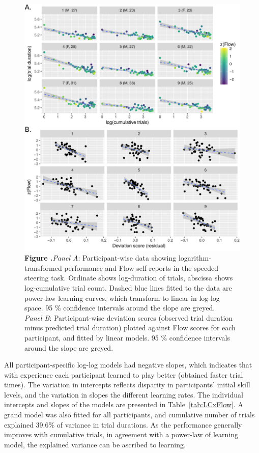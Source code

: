 \documentclass{frontierstyle/frontiersSCNS}
\begin{document}
\begin{figure}[!p]
	\centering
	\includegraphics[width=\linewidth]{cogcar_main}
	\textbf{\label{fig:flowVperf} Figure .}{{\it Panel A}: Participant-wise data showing logarithm-transformed performance and Flow self-reports in the speeded steering task. Ordinate shows log-duration of trials, abscissa shows log-cumulative trial count. Dashed blue lines fitted to the data are power-law learning curves, which transform to linear in log-log space. 95 \% confidence intervals around the slope are greyed.\\
	{\it Panel B}: Participant-wise deviation scores (observed trial duration minus predicted trial duration) plotted against Flow scores for each participant, and fitted by linear models. 95 \% confidence intervals around the slope are greyed.}
\end{figure}

All participant-specific log-log models had negative slopes, which indicates that with experience each participant learned to play better (obtained faster trial times). The variation in intercepts reflects disparity in participants' initial skill levels, and the variation in slopes the different learning rates. The individual intercepts and slopes of the models are presented in Table~\ref{tab:LCxFlow}. A grand model was also fitted for all participants, and cumulative number of trials explained 39.6\% of variance in trial durations. As the performance generally improves with cumulative trials, in agreement with a power-law of learning model, the explained variance can be ascribed to learning.
\end{document}
